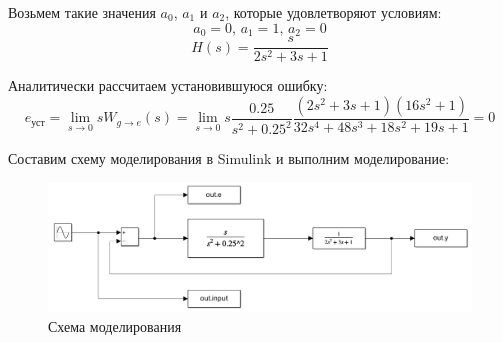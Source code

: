 Возьмем такие значения $a_0$, $a_1$ и $a_2$, которые удовлетворяют условиям:
\[
a_0 = 0,\, a_1 = 1,\, a_2 = 0
\]
\[
H(s) = \frac{s}{2s^2 + 3s + 1}
\]

Аналитически рассчитаем установившуюся ошибку:
\[
e_{\text{уст}} = \lim_{s \to 0} s W_{g\to e}(s) 
= \lim_{s \to 0} s \frac{0.25}{s^2 + 0.25^2} \frac{(2s^2 + 3s + 1)(16s^2 + 1)}{32s^4 + 48s^3 + 18s^2 + 19s + 1} = 0
\]

Составим схему моделирования в Simulink и выполним моделирование:
\begin{figure}[H]
    \centering
    \includegraphics[width=1\textwidth, trim={0cm 0cm 0cm 0cm}]{../images/sim5.png}
    \caption{Схема моделирования}
\end{figure}
